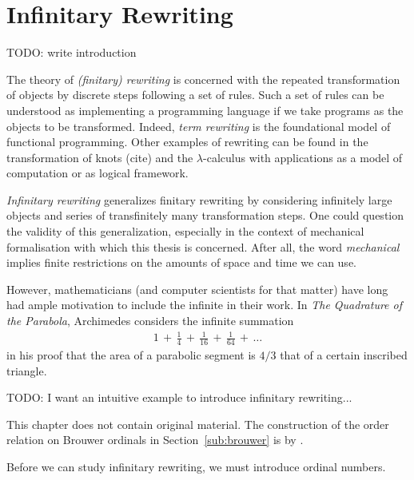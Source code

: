 \chapter{Infinitary Rewriting}\label{chap:rewriting}

TODO: write introduction

The theory of \emph{(finitary) rewriting} is concerned with the
repeated transformation of objects by discrete steps following a set
of rules. Such a set of rules can be understood as implementing a
programming language if we take programs as the objects to be
transformed. Indeed, \emph{term rewriting} is the foundational model
of functional programming. Other examples of rewriting can be found in
the transformation of knots (cite) and the $\lambda$-calculus with
applications as a model of computation or as logical framework.

\emph{Infinitary rewriting} generalizes finitary rewriting by
considering infinitely large objects and series of transfinitely many
transformation steps. One could question the validity of this
generalization, especially in the context of mechanical formalisation
with which this thesis is concerned. After all, the word
\emph{mechanical} implies finite restrictions on the amounts of space
and time we can use.

However, mathematicians (and computer scientists for that matter) have
long had ample motivation to include the infinite in their work. In
\emph{The Quadrature of the Parabola}, Archimedes considers the
infinite summation
\begin{align*}
  1 \,+\, \frac{1}{4} \,+\, \frac{1}{16} \,+\, \frac{1}{64} \,+\, \ldots
\end{align*}
in his proof that the area of a parabolic segment is $4/3$ that of a
certain inscribed triangle.





TODO: I want an intuitive example to introduce infinitary rewriting...

This chapter does not contain original material. The construction of the
order relation on Brouwer ordinals in Section~\ref{sub:brouwer} is by
\citet{hancock-08}.

Before we can study infinitary rewriting, we must introduce ordinal numbers.


